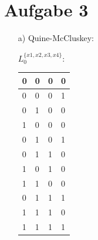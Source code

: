 \documentclass{scrartcl}
\begin{document}
	\section*{Aufgabe 3}
	\begin{itemize}
		\item[a)] Quine-McCluskey:\\
		
	\begin{minipage}{0.3\textwidth}
	$ L_{0}^{\{x1,x2,x3,x4\}}: $\\	
			\begin{tabular}{llll}
		0 & 0 & 0 & 0\\ \hline
		0 & 0 & 0 & 1\\
		0 & 1 & 0 & 0\\
		1 & 0 & 0 & 0\\ \hline
		0 & 1 & 0 & 1\\
		0 & 1 & 1 & 0\\
		1 & 0 & 1 & 0\\
		1 & 1 & 0 & 0\\ \hline
		0 & 1 & 1 & 1\\
		1 & 1 & 1 & 0\\\hline
		1 & 1 & 1 & 1\\
					

\end{tabular}
\end{minipage}
\end{itemize}
\end{document}
